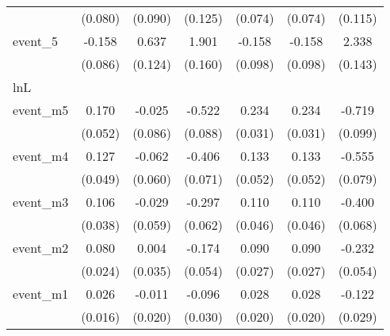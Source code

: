 {\begin{tabular}{l*{6}{c}}
            &     (0.080)         &     (0.090)         &     (0.125)         &     (0.074)         &     (0.074)         &     (0.115)         \\
[1em]
event\_5     &      -0.158         &       0.637\sym{***}&       1.901\sym{***}&      -0.158         &      -0.158         &       2.338\sym{***}\\
            &     (0.086)         &     (0.124)         &     (0.160)         &     (0.098)         &     (0.098)         &     (0.143)         \\
\hline
lnL         &                     &                     &                     &                     &                     &                     \\
event\_m5    &       0.170\sym{**} &      -0.025         &      -0.522\sym{***}&       0.234\sym{***}&       0.234\sym{***}&      -0.719\sym{***}\\
            &     (0.052)         &     (0.086)         &     (0.088)         &     (0.031)         &     (0.031)         &     (0.099)         \\
[1em]
event\_m4    &       0.127\sym{**} &      -0.062         &      -0.406\sym{***}&       0.133\sym{*}  &       0.133\sym{*}  &      -0.555\sym{***}\\
            &     (0.049)         &     (0.060)         &     (0.071)         &     (0.052)         &     (0.052)         &     (0.079)         \\
[1em]
event\_m3    &       0.106\sym{**} &      -0.029         &      -0.297\sym{***}&       0.110\sym{*}  &       0.110\sym{*}  &      -0.400\sym{***}\\
            &     (0.038)         &     (0.059)         &     (0.062)         &     (0.046)         &     (0.046)         &     (0.068)         \\
[1em]
event\_m2    &       0.080\sym{**} &       0.004         &      -0.174\sym{**} &       0.090\sym{***}&       0.090\sym{***}&      -0.232\sym{***}\\
            &     (0.024)         &     (0.035)         &     (0.054)         &     (0.027)         &     (0.027)         &     (0.054)         \\
[1em]
event\_m1    &       0.026         &      -0.011         &      -0.096\sym{**} &       0.028         &       0.028         &      -0.122\sym{***}\\
            &     (0.016)         &     (0.020)         &     (0.030)         &     (0.020)         &     (0.020)         &     (0.029)         \\

\end{tabular}}
